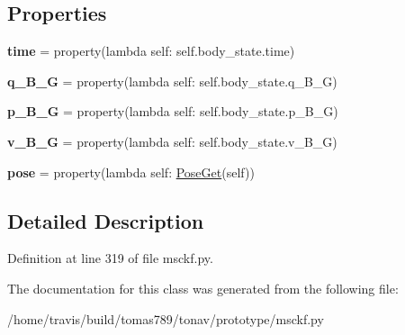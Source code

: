 \subsection*{Properties}
\begin{DoxyCompactItemize}
\item 
\hypertarget{classmsckf_1_1_state_abde5f106d34d598e79e5130308fd9103}{{\bfseries time} = property(lambda self\-: self.\-body\-\_\-state.\-time)}\label{classmsckf_1_1_state_abde5f106d34d598e79e5130308fd9103}

\item 
\hypertarget{classmsckf_1_1_state_aa0757a330d508319925982feed2f20a9}{{\bfseries q\-\_\-\-B\-\_\-\-G} = property(lambda self\-: self.\-body\-\_\-state.\-q\-\_\-\-B\-\_\-\-G)}\label{classmsckf_1_1_state_aa0757a330d508319925982feed2f20a9}

\item 
\hypertarget{classmsckf_1_1_state_a44862ee855b4fcedd843693f33932374}{{\bfseries p\-\_\-\-B\-\_\-\-G} = property(lambda self\-: self.\-body\-\_\-state.\-p\-\_\-\-B\-\_\-\-G)}\label{classmsckf_1_1_state_a44862ee855b4fcedd843693f33932374}

\item 
\hypertarget{classmsckf_1_1_state_a4a626bb3ecffdbc910bde67231f5825e}{{\bfseries v\-\_\-\-B\-\_\-\-G} = property(lambda self\-: self.\-body\-\_\-state.\-v\-\_\-\-B\-\_\-\-G)}\label{classmsckf_1_1_state_a4a626bb3ecffdbc910bde67231f5825e}

\item 
\hypertarget{classmsckf_1_1_state_ac75587b0f3c1c263d063e437d75a5384}{{\bfseries pose} = property(lambda self\-: \hyperlink{classmsckf_1_1_pose_get}{Pose\-Get}(self))}\label{classmsckf_1_1_state_ac75587b0f3c1c263d063e437d75a5384}

\end{DoxyCompactItemize}


\subsection{Detailed Description}


Definition at line 319 of file msckf.\-py.



The documentation for this class was generated from the following file\-:\begin{DoxyCompactItemize}
\item 
/home/travis/build/tomas789/tonav/prototype/msckf.\-py\end{DoxyCompactItemize}
